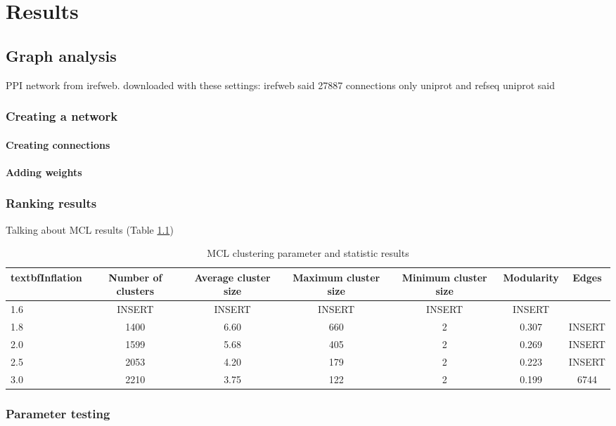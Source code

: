 \part{Results}
\label{pa:results}
\chapter{Graph analysis}
PPI network from irefweb.
downloaded with these settings: %
irefweb said 27887 connections %
only uniprot and refseq
uniprot said
\section{Creating a network}
\subsection{Creating connections}
\subsection{Adding weights}
\section{Ranking results}
Talking about MCL results (Table \ref{tab:mcl-inflation})
\begin{table}
    \centering
    \begin{tabular}{| l | c | c | c | c | c | c |}
        \\textbf{Inflation} & \textbf{Number of clusters} & \textbf{Average
    cluster size} & \textbf{Maximum cluster size} & \textbf{Minimum cluster
    size} & \textbf{Modularity} & \textbf{Edges}\\
        \hline
        1.6 & INSERT & INSERT & INSERT & INSERT & INSERT \\
        1.8 & 1400 & 6.60 & 660 & 2 & 0.307 & INSERT \\
        2.0 & 1599 & 5.68 & 405 & 2 & 0.269 & INSERT \\
        2.5 & 2053 & 4.20 & 179 & 2 & 0.223 & INSERT \\
        3.0 & 2210 & 3.75 & 122 & 2 & 0.199 & 6744 \\
        \hline
    \end{tabular}
    \caption{MCL clustering parameter and statistic results}
    \label{tab:mcl-inflation}
\end{table}
\section{Parameter testing}
